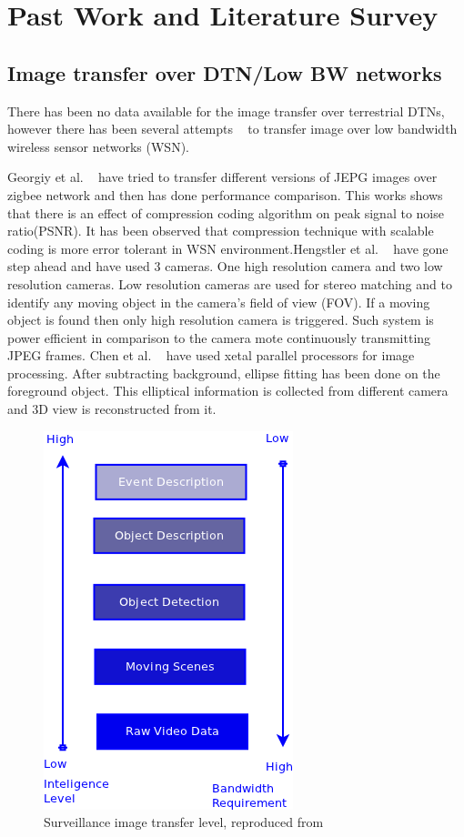 \section{Past Work and Literature Survey}

\subsection{Image transfer over DTN/Low BW networks}

There has been no data available for the image transfer over terrestrial
DTNs, however there has been several attempts ~\cite{2, 3, 4, 5} to transfer
image over low bandwidth wireless sensor networks (WSN).

Georgiy et al. ~\cite{2} have tried to transfer different versions of JEPG
images over zigbee network and then has done performance comparison.
This works shows that there is an effect of compression coding algorithm
on peak signal to noise ratio(PSNR). It has been observed that
compression technique with scalable coding is more error tolerant in WSN
environment.Hengstler et al. ~\cite{3, 5} have gone step ahead and have used 3
cameras. One high resolution camera and two low resolution cameras. Low
resolution cameras are used for stereo matching and to identify any
moving object in the camera's field of view (FOV). If a moving object is
found then only high resolution camera is triggered. Such system is
power efficient in  comparison to the camera mote continuously
transmitting JPEG frames. Chen et al. ~\cite{4} have used xetal parallel
processors for image processing. After subtracting background, ellipse
fitting has been done on the foreground object. This elliptical
information is collected from different camera and 3D view is
reconstructed from it. 

\begin{figure}[!b]
\centering
\includegraphics[scale=0.80]{Figures/image_tr_level}
\caption{Surveillance image transfer level, reproduced from ~\cite{3}}
\label{image_tr_level}
\end{figure}

